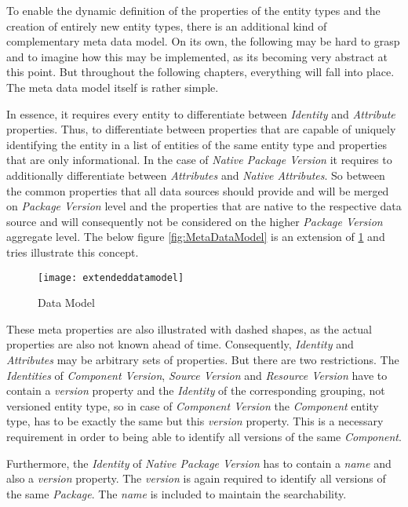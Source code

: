 To enable the dynamic definition of the properties of the entity types and the creation of entirely new entity types, there is an additional kind of complementary meta data model. On its own, the following may be hard to grasp and to imagine how this may be implemented, as its becoming very abstract at this point. But throughout the following chapters, everything will fall into place. The meta data model itself is rather simple.\par 
In essence, it requires every entity to differentiate between \emph{Identity} and \emph{Attribute} properties. Thus, to differentiate between properties that are capable of uniquely identifying the entity in a list of entities of the same entity type and properties that are only informational. In the case of \emph{Native Package Version} it requires to additionally differentiate between \emph{Attributes} and \emph{Native Attributes}. So between the common properties that all data sources should provide and will be merged on \emph{Package Version} level and the properties that are native to the respective data source and will consequently not be considered on the higher \emph{Package Version} aggregate level. The below figure \ref{fig:MetaDataModel} is an extension of \ref{fig:DataModel} and tries illustrate this concept.

\begin{figure}[H]
	\centering
	\texttt{[image: extendeddatamodel]}
	\caption[Data Model]{Data Model }
	\label{fig:DataModel}
\end{figure} 

These meta properties are also illustrated with dashed shapes, as the actual properties are also not known ahead of time. Consequently, \emph{Identity} and \emph{Attributes} may be arbitrary sets of properties. But there are two restrictions. The \emph{Identities} of \emph{Component Version}, \emph{Source Version} and \emph{Resource Version} have to contain a \emph{version} property and the \emph{Identity} of the corresponding grouping, not versioned entity type, so in case of \emph{Component Version} the \emph{Component} entity type, has to be exactly the same but  this \emph{version} property. This is a necessary requirement in order to being able to identify all versions of the same \emph{Component}.\par
Furthermore, the \emph{Identity} of \emph{Native Package Version} has to contain a \emph{name} and also a \emph{version} property. The \emph{version} is again required to identify all versions of the same \emph{Package}. The \emph{name} is included to maintain the searchability.

